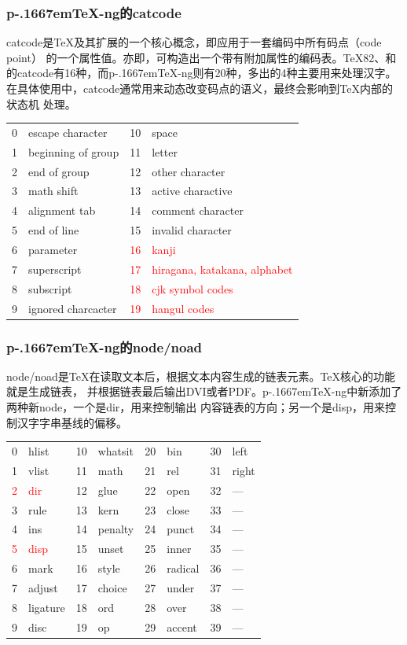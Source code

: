 \documentclass[dvipdfmx]{beamer}
\newcommand{\pTeX}{p\kern-.1667em\TeX}
\newcommand{\ptexng}{\pTeX-ng}
\begin{document}
\begin{frame}[fragile]
\frametitle{\ptexng 的catcode}
catcode是\TeX 及其扩展的一个核心概念，即应用于一套编码中所有码点（code point）
的一个属性值。亦即，可构造出一个带有附加属性的编码表。\TeX82、和
的catcode有16种，而\ptexng 则有20种，多出的4种主要用来处理汉字。
在具体使用中，catcode通常用来动态改变码点的语义，最终会影响到\TeX 内部的状态机
处理。

\begin{center}
\newcommand{\pcc}[1]{\textcolor{red}{#1}}
\begin{tabular}{clcl}
0 &escape character    &10       &space\\
1 &beginning of group  &11       &letter\\
2 &end of group        &12       &other character\\
3 &math shift          &13       &active charactive\\
4 &alignment tab       &14       &comment character\\
5 &end of line         &15       &invalid character\\
6 &parameter           &\pcc{16} &\pcc{kanji}\\
7 &superscript         &\pcc{17} &\pcc{hiragana, katakana, alphabet}\\
8 &subscript           &\pcc{18} &\pcc{cjk symbol codes}\\
9 &ignored charcacter  &\pcc{19} &\pcc{hangul codes}\\
\end{tabular}
\end{center}
\end{frame}
%
\begin{frame}[fragile]
\frametitle{\ptexng 的node/noad}
node/noad是\TeX 在读取文本后，根据文本内容生成的链表元素。\TeX 核心的功能就是生成链表，
并根据链表最后输出DVI或者PDF。\ptexng 中新添加了两种新node，一个是dir，用来控制输出
内容链表的方向；另一个是disp，用来控制汉字字串基线的偏移。

\begin{center}
\newcommand{\pcc}[1]{\textcolor{red}{#1}}
\begin{tabular}{clclclcl}
0      &hlist      &10 &whatsit &20 &bin     &30 &left\\
1      &vlist      &11 &math    &21 &rel     &31 &right\\
\pcc{2}&\pcc{dir}  &12 &glue    &22 &open    &32 &---\\
3      &rule       &13 &kern    &23 &close   &33 &---\\
4      &ins        &14 &penalty &24 &punct   &34 &---\\
\pcc{5}&\pcc{disp} &15 &unset   &25 &inner   &35 &---\\
6      &mark       &16 &style   &26 &radical &36 &---\\
7      &adjust     &17 &choice  &27 &under   &37 &---\\
8      &ligature   &18 &ord     &28 &over    &38 &---\\
9      &disc       &19 &op      &29 &accent  &39 &---\\
\end{tabular}
\end{center}
\end{frame}
\end{document}
